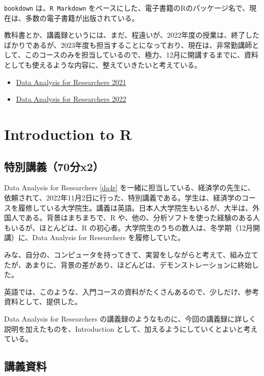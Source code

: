 \documentclass[
]{bxjsbook}
\providecommand{\tightlist}{%
  \setlength{\itemsep}{0pt}\setlength{\parskip}{0pt}}
\theoremstyle{definition}
\theoremstyle{definition}
\theoremstyle{definition}
\theoremstyle{definition}
\theoremstyle{remark}
\begin{document}
\texttt{bookdown} は、\texttt{R\ Markdown} をベースにした、電子書籍のRのパッケージ名で、現在は、多数の電子書籍が出版されている。

教科書とか、講義録というには、まだ、程遠いが、2022年度の授業は、終了したばかりであるが、2023年度も担当することになっており、現在は、非常勤講師として、このコースのみを担当しているので、極力、12月に開講するまでに、資料としても使えるような内容に、整えていきたいと考えている。

\begin{itemize}
\tightlist
\item
  \href{https://icu-hsuzuki.github.io/da4r2021/}{Data Analysis for Researchers 2021}
\item
  \href{https://icu-hsuzuki.github.io/da4r2022/}{Data Analysis for Researchers 2022}
\end{itemize}

\hypertarget{intro2r}{%
\section{Introduction to R}\label{intro2r}}

\hypertarget{ux7279ux5225ux8b1bux7fa970ux5206x2}{%
\subsection{特別講義（70分x2）}\label{ux7279ux5225ux8b1bux7fa970ux5206x2}}

Data Analysis for Researchers \ref{da4r} を一緒に担当している、経済学の先生に、依頼されて、2022年11月2日に行った、特別講義である。学生は、経済学のコースを履修している大学院生。講義は英語。日本人大学院生もいるが、大半は、外国人である。背景はまちまちで、R や、他の、分析ソフトを使った経験のある人もいるが、ほとんどは、R の初心者。大学院生のうちの数人は、冬学期（12月開講）に、Data Analysis for Researchers を履修していた。

みな、自分の、コンピュータを持ってきて、実習をしながらと考えて、組み立てたが、あまりに、背景の差があり、ほどんどは、デモンストレーションに終始した。

英語では、このような、入門コースの資料がたくさんあるので、少しだけ、参考資料として、提供した。

Data Analysis for Researchers の講義録のようなものに、今回の講義録に詳しく説明を加えたものを、Introduction として、加えるようにしていくとよいと考えている。

\hypertarget{ux8b1bux7fa9ux8cc7ux6599}{%
\subsection{講義資料}\label{ux8b1bux7fa9ux8cc7ux6599}}
\end{document}
